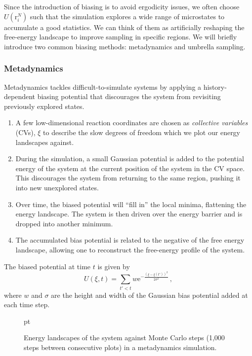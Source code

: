 \documentclass{article}
\theoremstyle{plain}\theoremheaderfont{\normalfont\itshape}\theorembodyfont{\rmfamily}\theoremseparator{.}\newtheorem*{rem}{Remark}\newtheorem*{ex}{Example}\newtheorem*{proof}{Proof}\newtheorem*{altp}{Alternative proof}
\theoremstyle{plain}\theoremheaderfont{\normalfont\bfseries}\theorembodyfont{\rmfamily}\theoremseparator{.}\newtheorem{thm}{Theorem}[section]\newtheorem{lem}[thm]{Lemma}\newtheorem{prop}[thm]{Proposition}\newtheorem*{cor}{Corollary}\newtheorem{defn}[thm]{Definition}\newtheorem{clm}[thm]{Claim}\newtheorem{clminproof}{Claim}\newtheorem{alg}[thm]{Algorithm}\newtheorem{hyp}[thm]{Hypothesis}\newtheorem{law}[thm]{Law}
\theoremstyle{break}\theoremheaderfont{\normalfont\itshape}\theorembodyfont{\rmfamily}\theoremseparator{.\medskip}\newtheorem*{proofskip}{Proof}\newtheorem*{exs}{Examples}\newtheorem*{rems}{Remarks}
\theoremstyle{break}\theoremheaderfont{\normalfont\bfseries}\theorembodyfont{\rmfamily}\theoremseparator{.\medskip}\newtheorem{lemskip}[thm]{Lemma}\newtheorem{defnskip}[thm]{Definition}\newtheorem{propskip}[thm]{Proposition}\newtheorem{thmskip}[thm]{Theorem}
\numberwithin{equation}{section}
\newcommand{\ee}{\mathrm{e}}
\newcommand{\vb}[1]{\bm{\mathrm{#1}}}
\begin{document}
    Since the introduction of biasing is to avoid ergodicity issues, we often choose \(U(\vb{r}_i^N)\) such that the simulation explores a wide range of microstates to accumulate a good statistics. We can think of them as artificially reshaping the free-energy landscape to improve sampling in specific regions. We will briefly introduce two common biasing methods: metadynamics and umbrella sampling.

    \subsubsection*{Metadynamics}
    Metadynamics tackles difficult-to-simulate systems by applying a history-dependent biasing potential that discourages the system from revisiting previously  explored states.
    \begin{enumerate}[topsep=0pt]
        \item A few low-dimensional reaction coordinates are chosen as \textit{collective variables} (CVs), \(\xi\) to describe the slow degrees of freedom which we plot our energy landscapes against.
        \item During the simulation, a small Gaussian potential is added to the potential energy of the system at the current position of the system in the CV space. This discourages the system from returning to the same region, pushing it into new unexplored states.
        \item Over time, the biased potential will ``fill in'' the local minima, flattening the energy landscape. The system is then driven over the energy barrier and is dropped into another minimum.
        \item The accumulated bias potential is related to the negative of the free energy landscape, allowing one to reconstruct the free-energy profile of the system.
    \end{enumerate}

    The biased potential at time \(t\) is given by
    \begin{equation}
        U(\xi,t)=\sum_{t'<t}w\ee^{-\frac{(\xi-\xi(t'))^2}{2\sigma^2}}\,,
    \end{equation}
    where \(w\) and \(\sigma\) are the height and width of the Gaussian bias potential added at each time step.
    
    \begin{figure}
        \centering
        
         pt
        \caption{Energy landscapes of the system against Monte Carlo steps (1,000 steps between consecutive plots) in a metadynamics simulation.}
    \end{figure}
\end{document}
